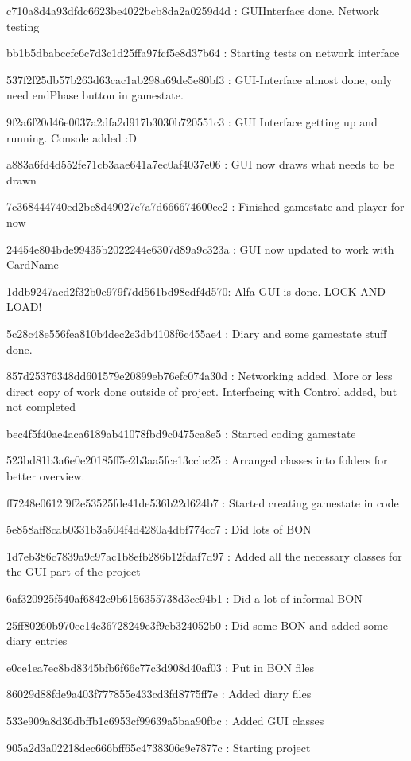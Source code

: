 c710a8d4a93dfdc6623be4022bcb8da2a0259d4d : GUIInterface done. Network testing

bb1b5dbabccfc6c7d3c1d25ffa97fcf5e8d37b64 : Starting tests on network interface

537f2f25db57b263d63cac1ab298a69de5e80bf3 : GUI-Interface almost done, only need endPhase button in gamestate.

9f2a6f20d46e0037a2dfa2d917b3030b720551c3 : GUI Interface getting up and running. Console added :D

a883a6fd4d552fe71cb3aae641a7ec0af4037e06 : GUI now draws what needs to be drawn

7c368444740ed2bc8d49027e7a7d666674600ec2 : Finished gamestate and player for now

24454e804bde99435b2022244e6307d89a9c323a : GUI now updated to work with CardName

1ddb9247acd2f32b0e979f7dd561bd98edf4d570: Alfa GUI is done. LOCK AND LOAD!

5c28c48e556fea810b4dec2e3db4108f6c455ae4 : Diary and some gamestate stuff done.

857d25376348dd601579e20899eb76efc074a30d : Networking added. More or less direct copy of work done outside of project. Interfacing with Control added, but not completed

bec4f5f40ae4aca6189ab41078fbd9c0475ca8e5 : Started coding gamestate

523bd81b3a6e0e20185ff5e2b3aa5fce13ccbc25 : Arranged classes into folders for better overview.

ff7248e0612f9f2e53525fde41de536b22d624b7 : Started creating gamestate in code

5e858aff8cab0331b3a504f4d4280a4dbf774cc7 : Did lots of BON

1d7eb386c7839a9c97ac1b8efb286b12fdaf7d97 : Added all the necessary classes for the GUI part of the project

6af320925f540af6842e9b6156355738d3cc94b1 : Did a lot of informal BON

25ff80260b970ec14e36728249e3f9cb324052b0 : Did some BON and added some diary entries

e0ce1ea7ec8bd8345bfb6f66c77c3d908d40af03 : Put in BON files

86029d88fde9a403f777855e433cd3fd8775ff7e : Added diary files

533e909a8d36dbffb1c6953cf99639a5baa90fbc  : Added GUI classes 

905a2d3a02218dec666bff65c4738306e9e7877c : Starting project 